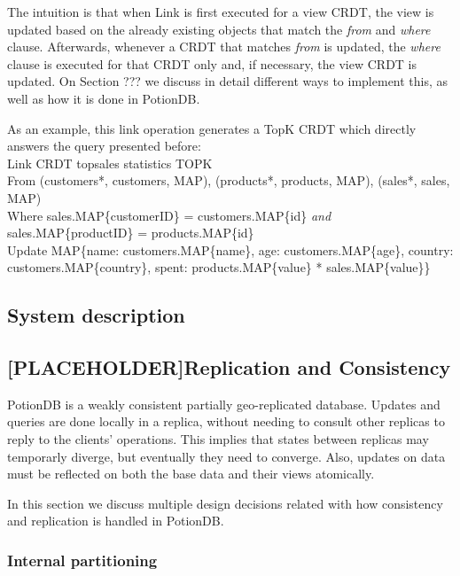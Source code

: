 \documentclass{vldb}
\begin{document}
The intuition is that when Link is first executed for a view CRDT, the view is updated based on the already existing objects that match the \emph{from} and \emph{where} clause.
Afterwards, whenever a CRDT that matches \emph{from} is updated, the \emph{where} clause is executed for that CRDT only and, if necessary, the view CRDT is updated.
On Section ??? we discuss in detail different ways to implement this, as well as how it is done in PotionDB. %

As an example, this link operation generates a TopK CRDT which directly answers the query presented before:
\\
Link CRDT topsales statistics TOPK \\
From (customers*, customers, MAP), (products*, products, MAP), (sales*, sales, MAP) \\
Where sales.MAP\{customerID\} = customers.MAP\{id\} \emph{and}  sales.MAP\{productID\} = products.MAP\{id\} \\
Update MAP\{name: customers.MAP\{name\}, age: customers.MAP\{age\}, country: customers.MAP\{country\}, spent: products.MAP\{value\} * sales.MAP\{value\}\} \\

\subsection{System description}


\subsection{[PLACEHOLDER]Replication and Consistency}

PotionDB is a weakly consistent partially geo-replicated database.
Updates and queries are done locally in a replica, without needing to consult other replicas to reply to the clients' operations.
This implies that states between replicas may temporarly diverge, but eventually they need to converge.
Also, updates on data must be reflected on both the base data and their views atomically.

In this section we discuss multiple design decisions related with how consistency and replication is handled in PotionDB.

\subsubsection{Internal partitioning}
\end{document}

